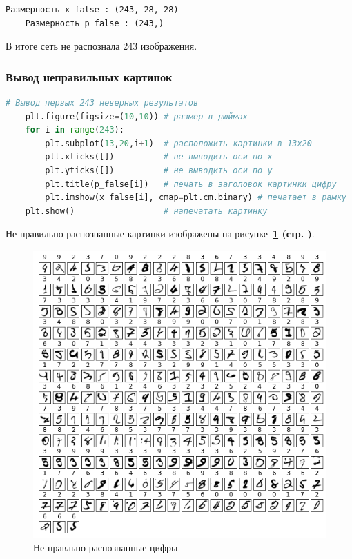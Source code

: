 \begin{lstlisting}[name=Вывод в консоль,]
    Размерность x_false : (243, 28, 28)
    Размерность p_false : (243,)
\end{lstlisting}

В итоге сеть не распознала 243 изображения.



\newpage



\subsubsection{Вывод неправильных картинок}

\begin{lstlisting}[language=Python,]
    # Вывод первых 243 неверных результатов
    plt.figure(figsize=(10,10)) # размер в дюймах
    for i in range(243):
        plt.subplot(13,20,i+1)  # расположить картинки в 13x20
        plt.xticks([])          # не выводить оси по x
        plt.yticks([])          # не выводить оси по y
        plt.title(p_false[i])   # печать в заголовок картинки цифру
        plt.imshow(x_false[i], cmap=plt.cm.binary) # печатает в рамку
    plt.show()                  # напечатать картинку
\end{lstlisting}

Не правильно распознанные картинки изображены на
рисунке~\textbf{\ref{fig:4_not_right_imgs} (стр. \pageref{fig:4_not_right_imgs})}.

\begin{figure}[!htbp]
    \centering
    \includegraphics[width=14cm]
    {_INCLUDES/main/4/not_right_imgs.png}
    \caption{Не правльно распознанные цифры}
    \label{fig:4_not_right_imgs}
\end{figure}